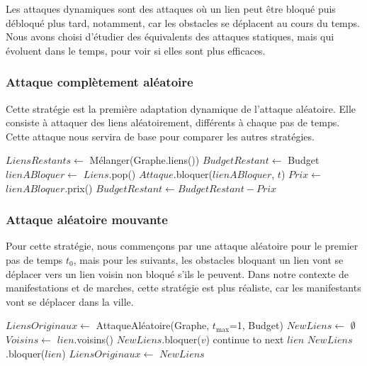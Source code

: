 Les attaques dynamiques sont des attaques où un lien peut être bloqué puis débloqué plus tard, notamment, car les obstacles se déplacent au cours du temps.
Nous avons choisi d'étudier des équivalents des attaques statiques, mais qui évoluent dans le temps, pour voir si elles sont plus efficaces.

\subsubsection{Attaque complètement aléatoire}\label{subsubsec:attaque_aleatoire}

Cette stratégie est la première adaptation dynamique de l'attaque aléatoire.
Elle consiste à attaquer des liens aléatoirement, différents à chaque pas de temps.
Cette attaque nous servira de base pour comparer les autres stratégies.
\begin{algorithm}[H]
\caption{Attaque complètement aléatoire}
\begin{algorithmic}
        \State $LiensRestants \gets$ Mélanger(Graphe.liens())
        \State $BudgetRestant \gets$ Budget
            \State $lienABloquer \gets$ $Liens$.pop()
            \State $Attaque$.bloquer($lienABloquer$, $t$)
            \State $Prix \gets$ $lienABloquer$.prix()
            \State $BudgetRestant \gets BudgetRestant - Prix$
        \EndWhile
    \EndFor
\end{algorithmic}
\end{algorithm}

\subsubsection{Attaque aléatoire mouvante}\label{subsubsec:attaque_mouvante}

Pour cette stratégie, nous commençons par une attaque aléatoire pour le premier pas de temps ${t_{0}}$, mais pour les suivants, les obstacles bloquant un lien vont se déplacer vers un lien voisin non bloqué s'ils le peuvent.
Dans notre contexte de manifestations et de marches, cette stratégie est plus réaliste, car les manifestants vont se déplacer dans la ville.
\begin{algorithm}[H]
\caption{Attaque mouvante}
\begin{algorithmic}
    \State $LiensOriginaux \gets$ AttaqueAléatoire(Graphe, ${t_{\max}}$=1, Budget)
        \State $NewLiens \gets$ $\emptyset$
            \State $Voisins \gets$ $lien$.voisins()
                    \State $NewLiens$.bloquer($v$)
                    \State continue to next $lien$
                \EndIf
            \EndFor
            \State $NewLiens$.bloquer($lien$)
        \EndFor
        \State $LiensOriginaux \gets$ $NewLiens$
    \EndFor
\end{algorithmic}
\end{algorithm}

